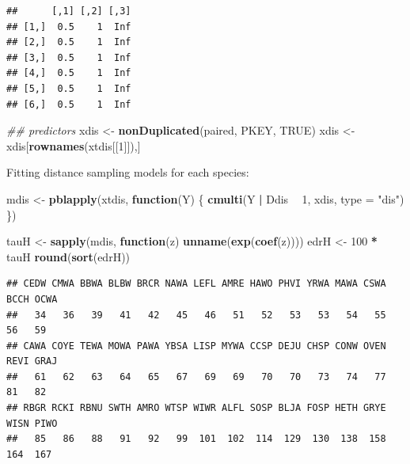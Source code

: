 \documentclass[12pt,]{book}
\newenvironment{Shaded}{\begin{snugshade}}{\end{snugshade}}
\newcommand{\CommentTok}[1]{\textcolor[rgb]{0.56,0.35,0.01}{\textit{#1}}}
\newcommand{\ControlFlowTok}[1]{\textcolor[rgb]{0.13,0.29,0.53}{\textbf{#1}}}
\newcommand{\DataTypeTok}[1]{\textcolor[rgb]{0.13,0.29,0.53}{#1}}
\newcommand{\DecValTok}[1]{\textcolor[rgb]{0.00,0.00,0.81}{#1}}
\newcommand{\KeywordTok}[1]{\textcolor[rgb]{0.13,0.29,0.53}{\textbf{#1}}}
\newcommand{\NormalTok}[1]{#1}
\newcommand{\OperatorTok}[1]{\textcolor[rgb]{0.81,0.36,0.00}{\textbf{#1}}}
\newcommand{\OtherTok}[1]{\textcolor[rgb]{0.56,0.35,0.01}{#1}}
\newcommand{\StringTok}[1]{\textcolor[rgb]{0.31,0.60,0.02}{#1}}
\begin{document}
\begin{verbatim}
##      [,1] [,2] [,3]
## [1,]  0.5    1  Inf
## [2,]  0.5    1  Inf
## [3,]  0.5    1  Inf
## [4,]  0.5    1  Inf
## [5,]  0.5    1  Inf
## [6,]  0.5    1  Inf
\end{verbatim}

\begin{Shaded}
\begin{Highlighting}[]
\CommentTok{## predictors}
\NormalTok{xdis <-}\StringTok{ }\KeywordTok{nonDuplicated}\NormalTok{(paired, PKEY, }\OtherTok{TRUE}\NormalTok{)}
\NormalTok{xdis <-}\StringTok{ }\NormalTok{xdis[}\KeywordTok{rownames}\NormalTok{(xtdis[[}\DecValTok{1}\NormalTok{]]),]}
\end{Highlighting}
\end{Shaded}

Fitting distance sampling models for each species:

\begin{Shaded}
\begin{Highlighting}[]
\NormalTok{mdis <-}\StringTok{ }\KeywordTok{pblapply}\NormalTok{(xtdis, }\ControlFlowTok{function}\NormalTok{(Y) \{}
  \KeywordTok{cmulti}\NormalTok{(Y }\OperatorTok{|}\StringTok{ }\NormalTok{Ddis }\OperatorTok{~}\StringTok{ }\DecValTok{1}\NormalTok{, xdis, }\DataTypeTok{type =} \StringTok{"dis"}\NormalTok{)}
\NormalTok{\})}
\end{Highlighting}
\end{Shaded}

\begin{Shaded}
\begin{Highlighting}[]
\NormalTok{tauH <-}\StringTok{ }\KeywordTok{sapply}\NormalTok{(mdis, }\ControlFlowTok{function}\NormalTok{(z) }\KeywordTok{unname}\NormalTok{(}\KeywordTok{exp}\NormalTok{(}\KeywordTok{coef}\NormalTok{(z))))}
\NormalTok{edrH <-}\StringTok{ }\DecValTok{100} \OperatorTok{*}\StringTok{ }\NormalTok{tauH}
\KeywordTok{round}\NormalTok{(}\KeywordTok{sort}\NormalTok{(edrH))}
\end{Highlighting}
\end{Shaded}

\begin{verbatim}
## CEDW CMWA BBWA BLBW BRCR NAWA LEFL AMRE HAWO PHVI YRWA MAWA CSWA BCCH OCWA 
##   34   36   39   41   42   45   46   51   52   53   53   54   55   56   59 
## CAWA COYE TEWA MOWA PAWA YBSA LISP MYWA CCSP DEJU CHSP CONW OVEN REVI GRAJ 
##   61   62   63   64   65   67   69   69   70   70   73   74   77   81   82 
## RBGR RCKI RBNU SWTH AMRO WTSP WIWR ALFL SOSP BLJA FOSP HETH GRYE WISN PIWO 
##   85   86   88   91   92   99  101  102  114  129  130  138  158  164  167
\end{verbatim}
\end{document}
